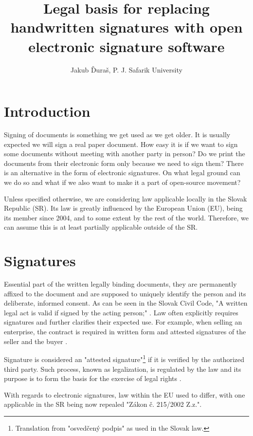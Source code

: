 \documentclass[a4paper,twocolumn]{article}
\title{Legal basis for replacing handwritten signatures with open electronic signature software}
\author{Jakub Ďuraš, P. J. Safarik University}
\begin{document}
{
    \maketitle
}

\section*{Introduction}

Signing of documents is something we get used as we get older.
It is usually expected we will sign a real paper document.
How easy it is if we want to sign some documents without meeting with another party in person?
Do we print the documents from their electronic form only because we need to sign them? There is an alternative in the form of electronic signatures.
On what legal ground can we do so and what if we also want to make it a part of open-source movement?

Unless specified otherwise, we are considering law applicable locally in the Slovak Republic (SR).
Its law is greatly influenced by the European Union (EU), being its member since 2004, and to some extent by the rest of the world.
Therefore, we can assume this is at least partially applicable outside of the SR.

\section{Signatures}

Essential part of the written legally binding documents, they are permanently affixed to the document and are supposed to uniquely identify the person and its deliberate, informed consent.
As can be seen in the Slovak Civil Code, "A written legal act is valid if signed by the acting person;" \cite{1}.
Law often explicitly requires signatures and further clarifies their expected use.
For example, when selling an enterprise, the contract is required in written form and attested signatures of the seller and the buyer \cite{2}.

Signature is considered an "attested signature"\footnote{Translation from "osvedčený podpis" as used in the Slovak law.} if it is verified by the authorized third party.
Such process, known as legalization, is regulated by the law and its purpose is to form the basis for the exercise of legal rights \cite{3}.

With regards to electronic signatures, law within the EU used to differ, with one applicable in the SR being now repealed "Zákon č. 215/2002 Z.z.".
\end{document}
